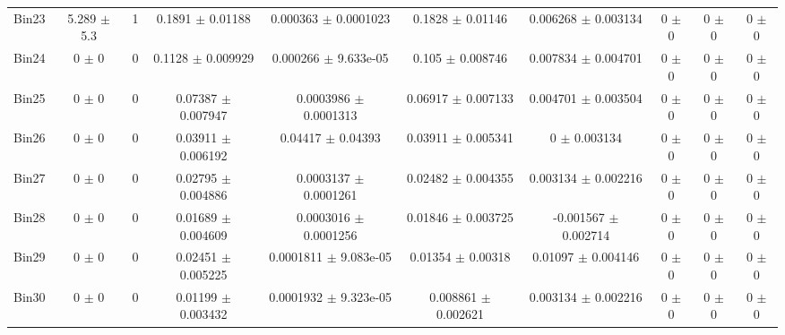 \begin{tabular}{@{\extracolsep{4pt}}lccccccccc@{}}
     Bin23 & 5.289 $\pm$ 5.3 & 1 & 0.1891 $\pm$ 0.01188 & 0.000363 $\pm$ 0.0001023 & 0.1828 $\pm$ 0.01146 & 0.006268 $\pm$ 0.003134 & 0 $\pm$ 0 & 0 $\pm$ 0 & 0 $\pm$ 0 \\ 
     Bin24 & 0 $\pm$ 0 & 0 & 0.1128 $\pm$ 0.009929 & 0.000266 $\pm$ 9.633e-05 & 0.105 $\pm$ 0.008746 & 0.007834 $\pm$ 0.004701 & 0 $\pm$ 0 & 0 $\pm$ 0 & 0 $\pm$ 0 \\ 
     Bin25 & 0 $\pm$ 0 & 0 & 0.07387 $\pm$ 0.007947 & 0.0003986 $\pm$ 0.0001313 & 0.06917 $\pm$ 0.007133 & 0.004701 $\pm$ 0.003504 & 0 $\pm$ 0 & 0 $\pm$ 0 & 0 $\pm$ 0 \\ 
     Bin26 & 0 $\pm$ 0 & 0 & 0.03911 $\pm$ 0.006192 & 0.04417 $\pm$ 0.04393 & 0.03911 $\pm$ 0.005341 & 0 $\pm$ 0.003134 & 0 $\pm$ 0 & 0 $\pm$ 0 & 0 $\pm$ 0 \\ 
     Bin27 & 0 $\pm$ 0 & 0 & 0.02795 $\pm$ 0.004886 & 0.0003137 $\pm$ 0.0001261 & 0.02482 $\pm$ 0.004355 & 0.003134 $\pm$ 0.002216 & 0 $\pm$ 0 & 0 $\pm$ 0 & 0 $\pm$ 0 \\ 
     Bin28 & 0 $\pm$ 0 & 0 & 0.01689 $\pm$ 0.004609 & 0.0003016 $\pm$ 0.0001256 & 0.01846 $\pm$ 0.003725 & -0.001567 $\pm$ 0.002714 & 0 $\pm$ 0 & 0 $\pm$ 0 & 0 $\pm$ 0 \\ 
     Bin29 & 0 $\pm$ 0 & 0 & 0.02451 $\pm$ 0.005225 & 0.0001811 $\pm$ 9.083e-05 & 0.01354 $\pm$ 0.00318 & 0.01097 $\pm$ 0.004146 & 0 $\pm$ 0 & 0 $\pm$ 0 & 0 $\pm$ 0 \\ 
     Bin30 & 0 $\pm$ 0 & 0 & 0.01199 $\pm$ 0.003432 & 0.0001932 $\pm$ 9.323e-05 & 0.008861 $\pm$ 0.002621 & 0.003134 $\pm$ 0.002216 & 0 $\pm$ 0 & 0 $\pm$ 0 & 0 $\pm$ 0 \\ 
\hline\hline
  \end{tabular}
